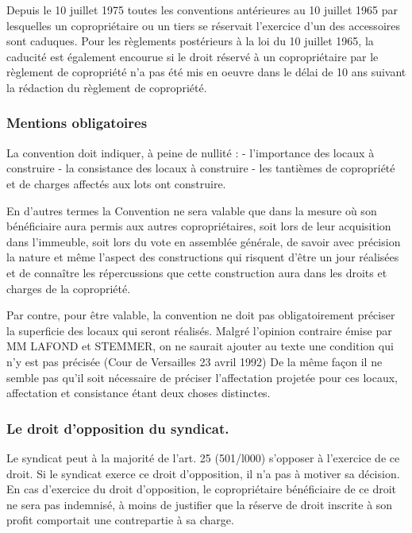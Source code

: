 	Depuis le 10 juillet 1975 toutes les conventions antérieures au 10 juillet 1965 par lesquelles un
	copropriétaire ou un tiers se réservait l'exercice d'un des accessoires sont caduques.
	Pour les règlements postérieurs à la loi du 10 juillet 1965, la caducité est également encourue si le droit
	réservé à un copropriétaire par le règlement de copropriété n’a pas été mis en oeuvre dans le délai de 10
	ans suivant la rédaction du règlement de copropriété.
	
	\subsubsection{Mentions obligatoires}
	
	 La convention doit indiquer, à peine de nullité :
	- l'importance des locaux à construire
	- la consistance des locaux à construire
	- les tantièmes de copropriété et de charges affectés aux lots ont construire.
	
	En d'autres termes la Convention ne sera valable que dans la mesure où son bénéficiaire aura permis aux
	autres copropriétaires, soit lors de leur acquisition dans l'immeuble, soit lors du vote en assemblée
	générale, de savoir avec précision la nature et même l'aspect des constructions qui risquent d'être un jour
	réalisées et de connaître les répercussions que cette construction aura dans les droits et charges de la
	copropriété.
	
	Par contre, pour être valable, la convention ne doit pas obligatoirement préciser la superficie des locaux
	qui seront réalisés. Malgré l'opinion contraire émise par MM LAFOND et STEMMER, on ne saurait ajouter
	au texte une condition qui n'y est pas précisée (Cour de Versailles 23 avril 1992) De la même façon il ne
	semble pas qu'il soit nécessaire de préciser l'affectation projetée pour ces locaux, affectation et
	consistance étant deux choses distinctes.
	
	\subsubsection{Le droit d'opposition du syndicat.}

	Le syndicat peut à la majorité de l'art. 25 (501/l000\degre{}) s'opposer à l'exercice de ce droit. Si le syndicat exerce
	ce droit d'opposition, il n'a pas à motiver sa décision.
	En cas d'exercice du droit d'opposition, le copropriétaire bénéficiaire de ce droit ne sera pas indemnisé, à
	moins de justifier que la réserve de droit inscrite à son profit comportait une contrepartie à sa charge.
	
